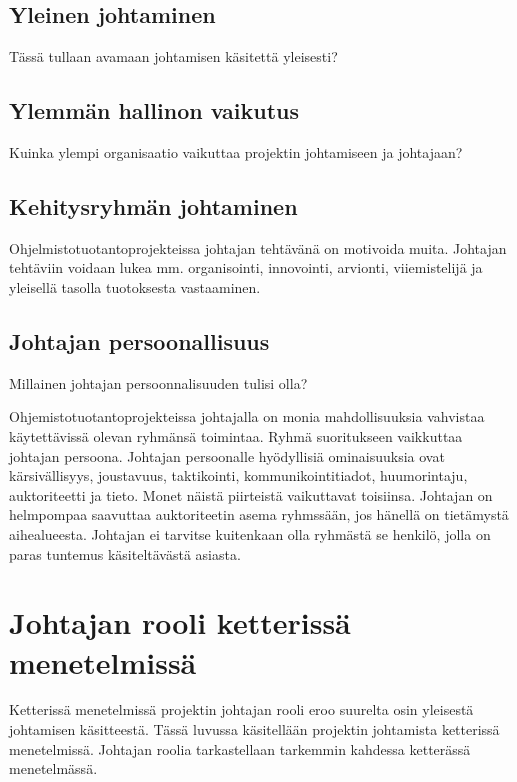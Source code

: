 \documentclass[finnish]{tktltiki2}
\theoremstyle{definition}
\theoremstyle{remark}
\begin{document}
\subsection{Yleinen johtaminen}

Tässä tullaan avamaan johtamisen käsitettä yleisesti?

\subsection{Ylemmän hallinon vaikutus}

Kuinka ylempi organisaatio vaikuttaa projektin johtamiseen ja johtajaan?

\subsection{Kehitysryhmän johtaminen}

Ohjelmistotuotantoprojekteissa johtajan tehtävänä on motivoida muita. Johtajan tehtäviin voidaan lukea mm. organisointi, innovointi, arvionti, viiemistelijä  ja yleisellä tasolla tuotoksesta vastaaminen. ~\cite{4017705}

\subsection{Johtajan persoonallisuus}

Millainen johtajan persoonnalisuuden tulisi olla?

Ohjemistotuotantoprojekteissa johtajalla on monia mahdollisuuksia vahvistaa käytettävissä olevan ryhmänsä toimintaa. Ryhmä suoritukseen vaikkuttaa johtajan persoona. Johtajan persoonalle hyödyllisiä ominaisuuksia ovat kärsivällisyys, joustavuus, taktikointi, kommunikointitiadot, huumorintaju, auktoriteetti ja tieto. Monet näistä piirteistä vaikuttavat toisiinsa. Johtajan on helmpompaa saavuttaa auktoriteetin asema ryhmssään, jos hänellä on tietämystä aihealueesta. Johtajan ei tarvitse kuitenkaan olla ryhmästä se henkilö, jolla on paras tuntemus käsiteltävästä asiasta.~\cite{4017705} 

\section{Johtajan rooli ketterissä menetelmissä}

Ketterissä menetelmissä projektin johtajan rooli eroo suurelta osin yleisestä johtamisen käsitteestä. Tässä luvussa käsitellään projektin johtamista ketterissä menetelmissä. Johtajan roolia tarkastellaan tarkemmin kahdessa ketterässä menetelmässä. 
\end{document}
